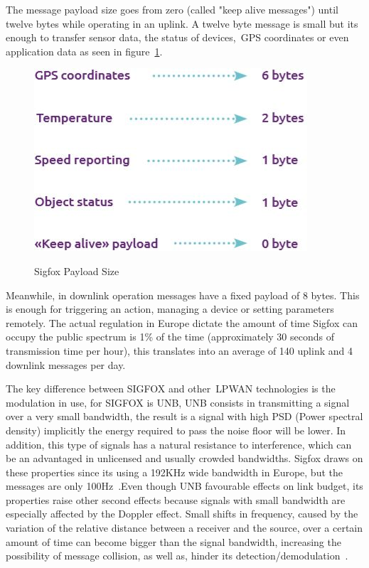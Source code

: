 The message payload size goes from zero (called "keep alive messages") until twelve bytes while operating in an uplink. A twelve byte message is small but its enough to transfer sensor data, the status of devices,~\gls{GPS} coordinates or even application data as seen in figure~\ref{fig:SigFox_Payload_size}.\\
\begin{figure}[htbp]
  \centering
  
    {\includegraphics[width=0.5\linewidth]{Chapters/Figures/SigfoxSize.JPG}}%
 
  \caption{Sigfox Payload Size~\cite{SIGTECH}}
  \label{fig:SigFox_Payload_size}
\end{figure}
Meanwhile, in downlink operation messages have a fixed payload of 8 bytes. This is enough for triggering an action, managing a device or setting parameters remotely. 
The actual regulation in Europe dictate the amount of time Sigfox can occupy the public spectrum is 1\% of the time (approximately 30 seconds of transmission time per hour), this translates into an average of 140 uplink and 4 downlink messages per day.

The key difference between SIGFOX and other~\gls{LPWAN} technologies is the modulation in use, for SIGFOX is UNB, UNB consists in transmitting a signal over a very small bandwidth, the result is a signal with high PSD (Power spectral density) implicitly the energy required to pass the noise floor will be lower. In addition, this type of signals has a natural resistance to interference, which can be an advantaged in unlicensed and usually crowded bandwidths. Sigfox draws on these properties since its using a 192KHz wide bandwidth in Europe, but the messages are only 100Hz~\cite{SIGTECH}.\newline Even though UNB favourable effects on link budget, its properties raise other second effects because signals with small bandwidth are especially affected by the  Doppler effect. Small shifts in frequency, caused by the variation of the relative distance between a receiver and the source, over a certain amount of time can become bigger than the signal bandwidth, increasing the possibility of message collision, as well as, hinder its detection/demodulation~\cite{Anteur2016}.

